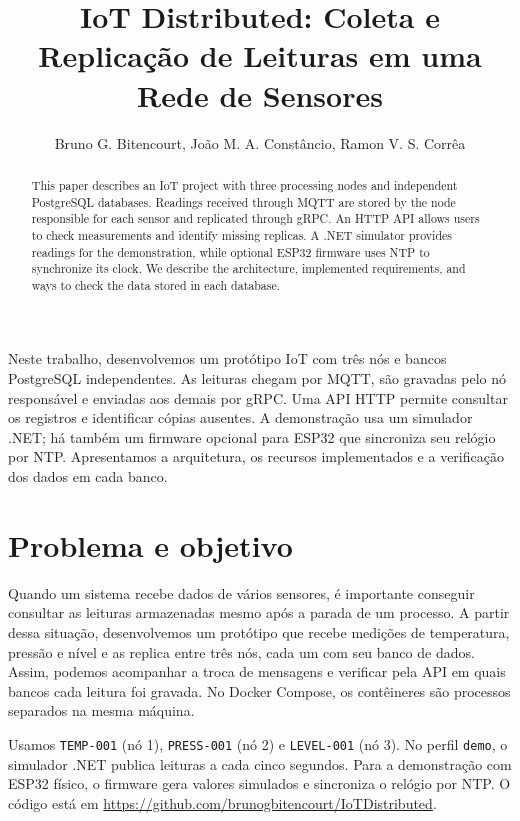 \documentclass[12pt]{article}
\title{IoT Distributed: Coleta e Replicação de Leituras em uma Rede de Sensores}
\author{Bruno G. Bitencourt\inst{1}, João M. A. Constâncio\inst{1},
Ramon V. S. Corrêa\inst{1}}
\begin{document}
\maketitle

\begin{abstract}
This paper describes an IoT project with three processing nodes and independent
PostgreSQL databases. Readings received through MQTT are stored by the node
responsible for each sensor and replicated through gRPC. An HTTP API allows
users to check measurements and identify missing replicas. A .NET simulator
provides readings for the demonstration, while optional ESP32 firmware uses
NTP to synchronize its clock. We describe the architecture, implemented
requirements, and ways to check the data stored in each database.
\end{abstract}

\begin{resumo}
Neste trabalho, desenvolvemos um protótipo IoT com três nós e bancos PostgreSQL
independentes. As leituras chegam por MQTT, são gravadas pelo nó responsável e
enviadas aos demais por gRPC. Uma API HTTP permite consultar os registros e
identificar cópias ausentes. A demonstração usa um simulador .NET; há também
um firmware opcional para ESP32 que sincroniza seu relógio por NTP.
Apresentamos a arquitetura, os recursos implementados e a verificação dos
dados em cada banco.
\end{resumo}

\section{Problema e objetivo}

Quando um sistema recebe dados de vários sensores, é importante conseguir
consultar as leituras armazenadas mesmo após a parada de um processo. A
partir dessa situação, desenvolvemos um protótipo que recebe medições de
temperatura, pressão e nível e as replica entre três nós, cada um com seu
banco de dados. Assim, podemos acompanhar a troca de mensagens e verificar pela
API em quais bancos cada leitura foi gravada. No Docker Compose, os
contêineres são processos separados na mesma máquina.

Usamos \texttt{TEMP-001} (nó 1), \texttt{PRESS-001} (nó 2) e
\texttt{LEVEL-001} (nó 3). No perfil \texttt{demo}, o simulador .NET publica
leituras a cada cinco segundos. Para a demonstração com ESP32 físico, o
firmware gera valores simulados e sincroniza o relógio por NTP. O código está em
\url{https://github.com/brunogbitencourt/IoTDistributed}.
\end{document}
